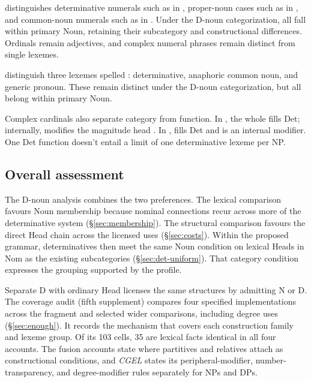 \documentclass[12pt]{article}
\begin{document}
\textcite{reynolds2026numerals} distinguishes determinative numerals such as  in , proper-noun cases such as  in , and common-noun numerals such as  in . Under the D-noun categorization, all fall within primary Noun, retaining their subcategory and constructional differences. Ordinals remain adjectives, and complex numeral phrases remain distinct from single lexemes.

\textcite[797--798]{payne2013anaphoric} distinguish three lexemes spelled : determinative, anaphoric common noun, and generic pronoun. These remain distinct under the D-noun categorization, but all belong within primary Noun.

Complex cardinals also separate category from function. In , the whole  fills Det; internally,  modifies the magnitude head  \citep[§4]{reynolds2026numerals}. In ,  fills Det and  is an internal modifier. One Det function doesn't entail a limit of one determinative lexeme per NP.

\subsection{Overall assessment}\label{sec:overall-assessment}

The D-noun analysis combines the two preferences. The lexical comparison favours Noun membership because nominal connections recur across more of the determinative system (§\ref{sec:membership}). The structural comparison favours the direct Head chain across the licensed uses (§\ref{sec:costs}). Within the proposed grammar, determinatives then meet the same Noun condition on lexical Heads in Nom as the existing subcategories (§\ref{sec:det-uniform}). That category condition expresses the grouping supported by the profile.

Separate D with ordinary Head licenses the same structures by admitting N or D. The coverage audit (fifth supplement) compares four specified implementations across the fragment and selected wider comparisons, including degree uses (§\ref{sec:enough}). It records the mechanism that covers each construction family and lexeme group. Of its 103 cells, 35 are lexical facts identical in all four accounts. The fusion accounts state where partitives and relatives attach as constructional conditions, and \textit{CGEL} states its peripheral-modifier, number-transparency, and degree-modifier rules separately for NPs and DPs.
\end{document}
